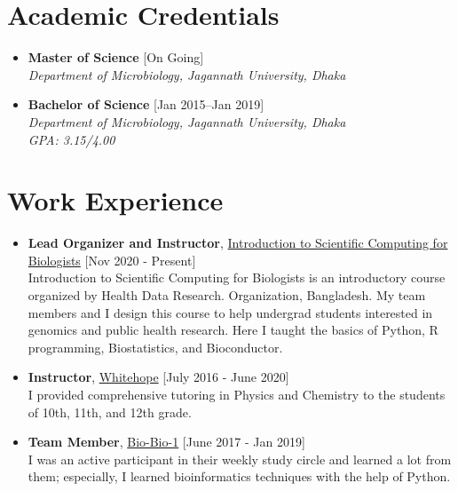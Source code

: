 \documentclass[11pt,a4paper]{moderncv}
\begin{document}
\hskip-2.5cm\makecvtitle
\section{Academic Credentials}
\begin{itemize}
\item \textbf{Master of Science} \hfill [On Going]\\
\textit{Department of Microbiology, Jagannath University, Dhaka}
\item \textbf{Bachelor of Science} \hfill [Jan 2015--Jan 2019]\\
\textit{Department of Microbiology, Jagannath University, Dhaka\\ GPA: 
3.15/4.00}
\end{itemize}

\section{Work Experience}
\begin{itemize}
	\item \textbf{Lead Organizer and Instructor}, 
	\textcolor{blue}{\href{https://scicomforbio.github.io/}{Introduction
	 to Scientific Computing for Biologists}} \hfil[Nov 2020 - Present] \\
	Introduction to Scientific Computing for Biologists is an introductory 
	course organized by Health Data Research.
	Organization, Bangladesh. My team members and I design this course to help 
	undergrad students interested in genomics and
	public health research. Here I taught the basics of Python, R programming, 
	Biostatistics, and Bioconductor.
	\item \textbf{Instructor}, 
	\textcolor{blue}{\href{}{Whitehope}}
	\hfill [July 2016 - June 2020]\\ 
	I provided comprehensive tutoring in Physics and Chemistry to the 
	students of 10th, 11th, and 12th grade.
	
	\item \textbf{Team Member}, 
	\textcolor{blue}{\href{}{Bio-Bio-1}}
	\hfill [June 2017 - Jan 2019]\\ 
	I was an active participant in their weekly study circle and learned a lot 
	from them; especially, I learned bioinformatics techniques with the 
	help of Python.
	
\end{itemize}
\end{document}
